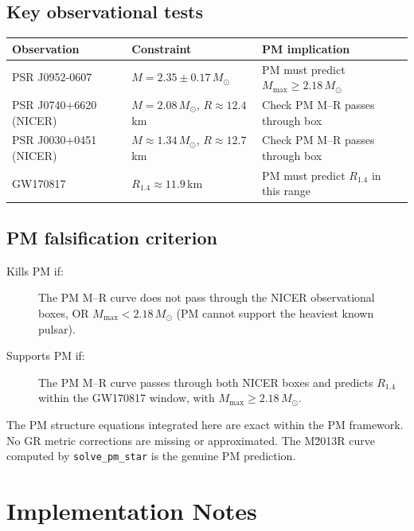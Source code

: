 \documentclass[11pt,a4paper]{article}
\newcommand{\Msun}{M_\odot}
\begin{document}
\subsection{Key observational tests}

\begin{center}
\begin{tabular}{p{4.5cm} p{4.5cm} p{4.5cm}}
  \toprule
  Observation & Constraint & PM implication \\
  \midrule
  PSR J0952-0607 & $M = 2.35 \pm 0.17\,\Msun$ & PM must predict $M_\text{max} \ge 2.18\,\Msun$ \\[4pt]
  PSR J0740+6620 (NICER) & $M = 2.08\,\Msun$, $R \approx 12.4\,$km & Check PM M–R passes through box \\[4pt]
  PSR J0030+0451 (NICER) & $M \approx 1.34\,\Msun$, $R \approx 12.7\,$km & Check PM M–R passes through box \\[4pt]
  GW170817 & $R_{1.4} \approx 11.9\,$km & PM must predict $R_{1.4}$ in this range \\
  \bottomrule
\end{tabular}
\end{center}

\subsection{PM falsification criterion}

\begin{description}
  \item[Kills PM if:] The PM M–R curve does not pass through the NICER
    observational boxes, OR $M_\text{max} < 2.18\,\Msun$ (PM cannot support
    the heaviest known pulsar).

  \item[Supports PM if:] The PM M–R curve passes through both NICER boxes and
    predicts $R_{1.4}$ within the GW170817 window, with
    $M_\text{max} \ge 2.18\,\Msun$.
\end{description}

The PM structure equations integrated here are exact within the PM framework.
No GR metric corrections are missing or approximated.  The M\u2013R curve
computed by \texttt{solve\_pm\_star} is the genuine PM prediction.

\section{Implementation Notes}
\end{document}
